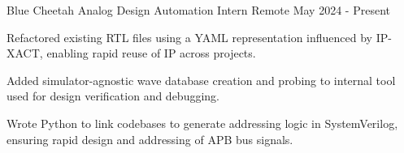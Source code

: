   \begin{cventry}
    {Blue Cheetah Analog} %
    {Design Automation Intern} %
    {Remote} %
    {May 2024 - Present} %
    {
      \begin{cvitems} %
        \item {
        Refactored existing RTL files using a YAML representation influenced by IP-XACT, enabling rapid reuse of IP across projects.
        }
        \item {
        Added simulator-agnostic wave database creation and probing to internal tool used for design verification and debugging.
        }
        \item {
        Wrote Python to link codebases to generate addressing logic in SystemVerilog, ensuring rapid design and addressing of APB bus signals.
        }
      \end{cvitems}
    }
  \end{cventry}
